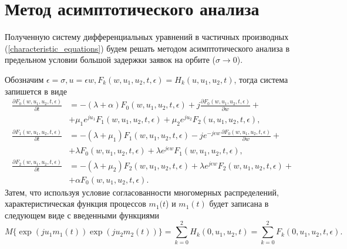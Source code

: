 \section{Метод асимптотического анализа}
Полученную систему дифференциальных уравнений в частичных производных  (\ref{characteristic_equations}) будем решать методом асимптотического анализа в предельном условии большой задержки заявок на орбите ($\sigma \xrightarrow{} 0$).

Обозначим $\epsilon = \sigma,   u= \epsilon w,   F_{k}(w,u_{1},u_{2},t,\epsilon) = H_{k}(u,u_{1},u_{2},t)$, тогда система запишется в виде
\begin{equation} \label{asymptotic_equations}
	\begin{split}
		\frac{{\partial F_{0}(w,u_{1},u_{2},t,\epsilon)}}{{\partial t}} &= -(\lambda + \alpha)F_{0}(w,u_{1},u_{2},t,\epsilon) + j
		\frac{{\partial F_{0}(w,u_{1},u_{2},t,\epsilon)}}{{\partial w}} +\\  &+ \mu_{1} e^{ju_{1}}F_{1}(w,u_{1},u_{2},t,\epsilon) + \mu_{2}e^{ju_{2}}F_{2}(u,u_{1},u_{2},t,\epsilon) ,
		\\
		\frac{{\partial F_{1}(w,u_{1},u_{2},t,\epsilon)}}{{\partial t}} &= -(\lambda + \mu_{1})F_{1}(w,u_{1},u_{2},t,\epsilon) - j e^{-j\epsilon w}
		\frac{{\partial F_{0}(w,u_{1},u_{2},t,\epsilon)}}{{\partial w}} +\\  &+ \lambda F_{0}(w,u_{1},u_{2},t,\epsilon) + \lambda e^{j\epsilon w}F_{1}(w,u_{1},u_{2},t,\epsilon) ,
		\\
		\frac{{\partial F_{2}(w,u_{1},u_{2},t,\epsilon)}}{{\partial t}} &= -(\lambda + \mu_{2})F_{2}(w,u_{1},u_{2},t,\epsilon)  + \lambda e^{j\epsilon w}F_{2}(w,u_{1},u_{2},t,\epsilon) +\\  &+ \alpha F_{0}(w,u_{1},u_{2},t,\epsilon).
	\end{split}
\end{equation}  
Затем, что используя условие согласованности многомерных распределений, характеристическая функция процессов $m_{1}(t$) и $m_{1}(t)$ будет записана в следующем виде с введенными функциями 
\begin{equation*}
	M\{\exp(ju_{1}m_{1}(t))\exp(ju_{2}m_{2}(t))\}=\sum_{k=0}^{2}H_{k}(0,u_{1},u_{2},t) = \sum_{k=0}^{2}F_{k}(0,u_{1},u_{2},t,\epsilon).
\end{equation*}

